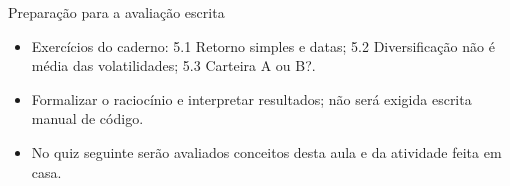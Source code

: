 \documentclass[10pt,aspectratio=169]{beamer}
\begin{document}
\begin{frame}[t]{Preparação para a avaliação escrita}
\small
\begin{itemize}
\item Exercícios do caderno: 5.1 Retorno simples e datas; 5.2 Diversificação não é média das volatilidades; 5.3 Carteira A ou B?.
\item Formalizar o raciocínio e interpretar resultados; não será exigida escrita manual de código.
\item No quiz seguinte serão avaliados conceitos desta aula e da atividade feita em casa.
\end{itemize}
\end{frame}
\end{document}
